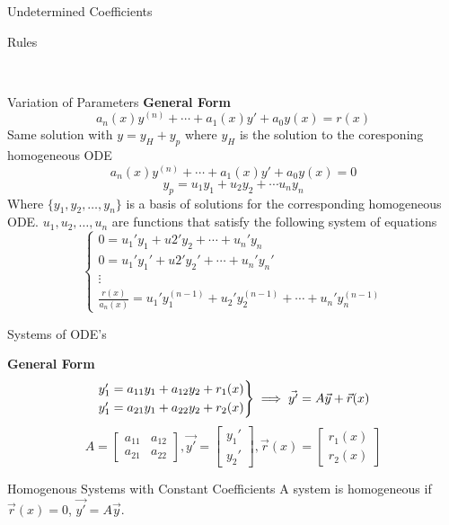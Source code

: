 \documentclass{article}
\begin{document}
\begin{multicols*}{3}
\begin{blackbox}{Undetermined Coefficients}
\begin{pinkbox}{Rules}
    \end{pinkbox}\\[-2ex]
\end{blackbox}
\begin{blackbox}{Variation of Parameters}
    {\footnotesize
    \textbf{General Form}\\[-2ex]
        \[a_n(x)y^{(n)} + \cdots + a_1(x)y' + a_0y(x) = r(x)\]
        Same solution with $y = y_H + y_p$ where $y_H$ is the solution to the coresponing homogeneous ODE\\[-1.5ex]
        \[a_n(x)y^{(n)} + \cdots + a_1(x)y' + a_0y(x) = 0\]
        \[y_p = u_1y_1 + u_2y_2 + \cdots u_ny_n\]
        Where $\{y_1,y_2,\ldots,y_n\}$ is a basis of solutions for the corresponding homogeneous ODE. $u_1, u_2, \ldots, u_n$ are functions that satisfy the following system of equations 
        \[\begin{cases}
            0 = u_1'y_1 + u2'y_2 + \cdots + u_n'y_n \\
            0 = u_1'y_1' + u2'y_2' + \cdots + u_n'y_n' \\
            \vdots\\
            \frac{r(x)}{a_n(x)} = u_1'y_1^{(n-1)} + u_2'y_2^{(n-1)} + \cdots + u_n'y_n ^{(n-1)} 
        \end{cases}\]
    }
\end{blackbox}
\begin{blackbox}{Systems of ODE's}
    {\footnotesize
    \textbf{General Form}\\[-2ex]
    \[\begin{rcases}
        y_1' = a_{11}y_1 + a_{12}y_2 + r_1(x)\\
        y_1' = a_{21}y_1 + a_{22}y_2 + r_2(x)  
    \end{rcases} \implies \vec{y'} = A\vec{y} + \vec{r}(x)\]
    \[A = \begin{bmatrix}
        a_{11} & a_{12}\\
        a_{21} & a_{22}
    \end{bmatrix}, \vec{y'} = \begin{bmatrix}
        y_1'\\
        y_2'
    \end{bmatrix}, \vec{r}(x) = \begin{bmatrix}
        r_1(x)\\
        r_2(x)
    \end{bmatrix}\]
    \begin{redbox}{Homogenous Systems with Constant Coefficients}
        A system is homogeneous if $\vec{r}(x) = 0$, $\vec{y'} = A\vec{y}$.

\end{redbox}}
\end{blackbox}
\end{multicols*}
\end{document}
